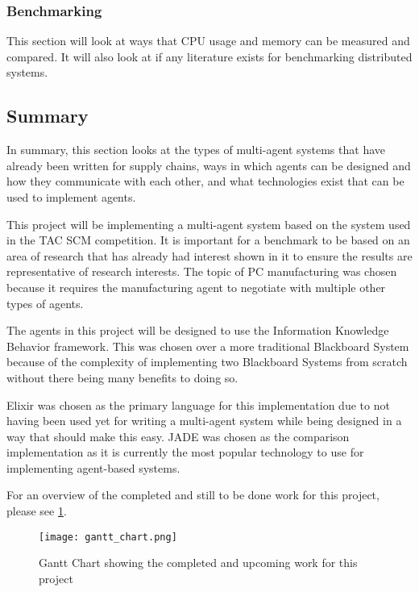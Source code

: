 \subsubsection{Benchmarking}

This section will look at ways that CPU usage and memory can be measured and compared.
It will also look at if any literature exists for benchmarking distributed systems.

\subsection{Summary}

In summary, this section looks at the types of multi-agent systems that have already been written for supply chains, ways in which agents can be designed and how they communicate with each other, and what technologies exist that can be used to implement agents.

This project will be implementing a multi-agent system based on the system used in the TAC SCM competition.
It is important for a benchmark to be based on an area of research that has already had interest shown in it to ensure the results are representative of research interests.
The topic of PC manufacturing was chosen because it requires the manufacturing agent to negotiate with multiple other types of agents.

The agents in this project will be designed to use the Information Knowledge Behavior framework.
This was chosen over a more traditional Blackboard System because of the complexity of implementing two Blackboard Systems from scratch without there being many benefits to doing so.

Elixir was chosen as the primary language for this implementation due to not having been used yet for writing a multi-agent system while being designed in a way that should make this easy.
JADE was chosen as the comparison implementation as it is currently the most popular technology to use for implementing agent-based systems.


For an overview of the completed and still to be done work for this project, please see \cref{fig:gantt_chart}.

\begin{figure}[h]
    \centering
    \texttt{[image: gantt\_chart.png]}
    \caption{Gantt Chart showing the completed and upcoming work for this project}\label{fig:gantt_chart}
\end{figure}
